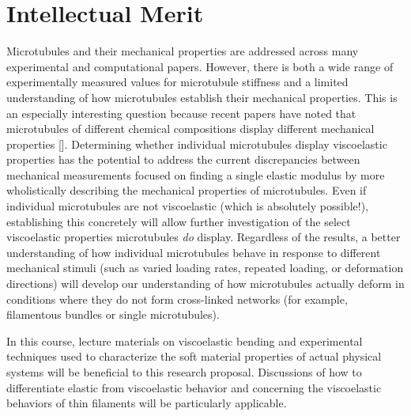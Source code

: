 \documentclass[preprint,12pt,authoryear]{elsarticle}
\begin{document}
\section{Intellectual Merit}
Microtubules and their mechanical properties are addressed across many experimental and computational papers. However, there is both a wide range of experimentally measured values for microtubule stiffness and a limited understanding of how microtubules establish their mechanical properties. This is an especially interesting question because recent papers have noted that microtubules of different chemical compositions display different mechanical properties [\cite{Celeg_lumen}]. Determining whether individual microtubules display viscoelastic properties has the potential to address the current discrepancies between mechanical measurements focused on finding a single elastic modulus by more wholistically describing the mechanical properties of microtubules. Even if individual microtubules are not viscoelastic (which is absolutely possible!), establishing this concretely will allow further investigation of the select viscoelastic properties microtubules \emph{do} display. Regardless of the results, a better understanding of how individual microtubules behave in response to different mechanical stimuli (such as varied loading rates, repeated loading, or deformation directions) will develop our understanding of how microtubules actually deform in conditions where they do not form cross-linked networks (for example, filamentous bundles or single microtubules). 

In this course, lecture materials on viscoelastic bending and experimental techniques used to characterize the soft material properties of actual physical systems will be beneficial to this research proposal. Discussions of how to differentiate elastic from viscoelastic behavior and concerning the viscoelastic behaviors of thin filaments will be particularly applicable.
\end{document}
